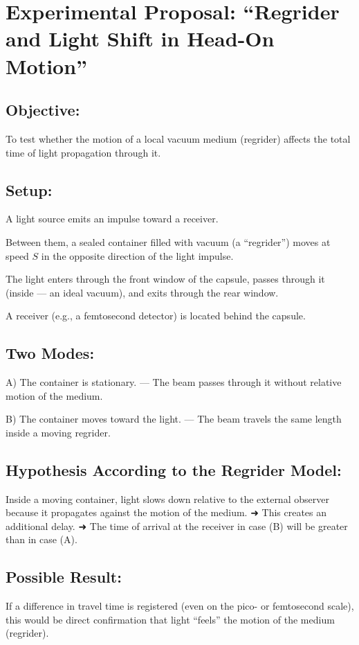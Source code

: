 \documentclass[12pt]{article}
\begin{document}
\section*{Experimental Proposal: “Regrider and Light Shift in Head-On Motion”}

\subsection*{Objective:}
To test whether the motion of a local vacuum medium (regrider) affects the total time of light propagation through it.

\subsection*{Setup:}
A light source emits an impulse toward a receiver.

Between them, a sealed container filled with vacuum (a “regrider”) moves at speed $S$ in the opposite direction of the light impulse.

The light enters through the front window of the capsule, passes through it (inside — an ideal vacuum), and exits through the rear window.

A receiver (e.g., a femtosecond detector) is located behind the capsule.

\subsection*{Two Modes:}
\par
A) The container is stationary.  
— The beam passes through it without relative motion of the medium.
\par
B) The container moves toward the light.  
— The beam travels the same length inside a moving regrider.

\subsection*{Hypothesis According to the Regrider Model:}
Inside a moving container, light slows down relative to the external observer because it propagates against the motion of the medium.  
➜ This creates an additional delay.  
➜ The time of arrival at the receiver in case (B) will be greater than in case (A).

\subsection*{Possible Result:}
If a difference in travel time is registered (even on the pico- or femtosecond scale), this would be direct confirmation that light “feels” the motion of the medium (regrider).
\end{document}

